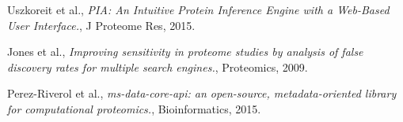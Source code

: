 \documentclass[a4paper,11pt,twoside]{article}
\begin{document}


\newpage
\begin{thebibliography}{9}
	Uszkoreit et al.,
	\emph{PIA: An Intuitive Protein Inference Engine with a Web-Based User
	Interface.},
	J Proteome Res,
	2015.

	Jones et al.,
	\emph{Improving sensitivity in proteome studies by analysis of false
	discovery rates for multiple search engines.},
	Proteomics,
	2009.

	Perez-Riverol et al.,
	\emph{ms-data-core-api: an open-source, metadata-oriented library for
	computational proteomics.},
	Bioinformatics,
	2015.
\end{thebibliography}
\end{document}
